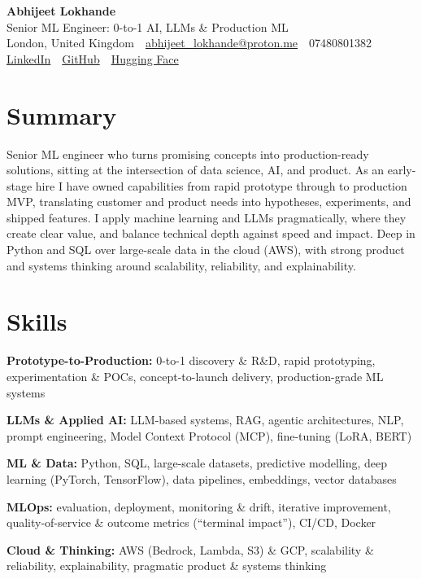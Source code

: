 \documentclass[10pt,a4paper]{article}
\newcommand{\sep}{\,\textcolor{accent!60}{\textbar}\,}
\begin{document}
\begin{center}
  {\fontsize{24}{26}\selectfont\bfseries Abhijeet Lokhande}\\[3pt]
  {\color{accent}\large Senior ML Engineer: 0-to-1 AI, LLMs \& Production ML}\\[5pt]
  {\small
    London, United Kingdom \sep
    \href{mailto:abhijeet_lokhande@proton.me}{abhijeet\_lokhande@proton.me} \sep
    07480801382 \\[2pt]
    \href{https://www.linkedin.com/in/ablds/}{LinkedIn} \sep
    \href{https://github.com/abhijeetscode}{GitHub} \sep
    \href{https://huggingface.co/ab-ai}{Hugging Face}
  }
\end{center}
\vspace{2pt}

\section{Summary}
Senior ML engineer who turns promising concepts into production-ready solutions, sitting at the intersection of data science, AI, and product. As an early-stage hire I have owned capabilities from rapid prototype through to production MVP, translating customer and product needs into hypotheses, experiments, and shipped features. I apply machine learning and LLMs pragmatically, where they create clear value, and balance technical depth against speed and impact. Deep in Python and SQL over large-scale data in the cloud (AWS), with strong product and systems thinking around scalability, reliability, and explainability.

\section{Skills}
\begin{tight}
  \item[\textcolor{accent}{\small$\bullet$}] \textbf{Prototype-to-Production:} 0-to-1 discovery \& R\&D, rapid prototyping, experimentation \& POCs, concept-to-launch delivery, production-grade ML systems
  \item[\textcolor{accent}{\small$\bullet$}] \textbf{LLMs \& Applied AI:} LLM-based systems, RAG, agentic architectures, NLP, prompt engineering, Model Context Protocol (MCP), fine-tuning (LoRA, BERT)
  \item[\textcolor{accent}{\small$\bullet$}] \textbf{ML \& Data:} Python, SQL, large-scale datasets, predictive modelling, deep learning (PyTorch, TensorFlow), data pipelines, embeddings, vector databases
  \item[\textcolor{accent}{\small$\bullet$}] \textbf{MLOps:} evaluation, deployment, monitoring \& drift, iterative improvement, quality-of-service \& outcome metrics (``terminal impact''), CI/CD, Docker
  \item[\textcolor{accent}{\small$\bullet$}] \textbf{Cloud \& Thinking:} AWS (Bedrock, Lambda, S3) \& GCP, scalability \& reliability, explainability, pragmatic product \& systems thinking
\end{tight}
\end{document}
